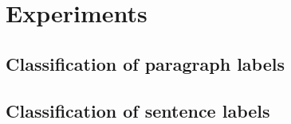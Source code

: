 \clearpage
\section{Experiments}

\subsection{Classification of paragraph labels}

\subsection{Classification of sentence labels}


